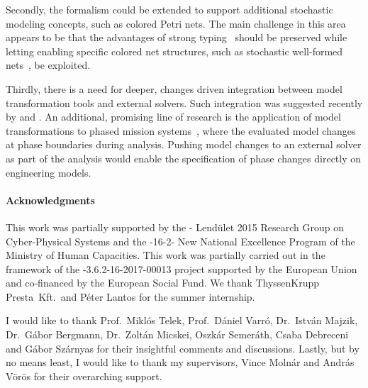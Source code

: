 Secondly, the  formalism could be extended to support additional stochastic modeling concepts, such as colored Petri nets. The main challenge in this area appears to be that the advantages of strong typing~\citep{Kindler07modular} should be preserved while letting enabling specific colored net structures, such as stochastic well-formed nets~\citep{Chiola93swn}, be exploited.

Thirdly, there is a need for deeper, changes driven integration between model transformation tools and external solvers. Such integration was suggested recently by \citet{Molnar16componentwise} and \citet[Section~2.8]{Meyers16thesis}. An additional, promising line of research is the application of model transformations to phased mission systems~\citep{Mura01pms}, where the evaluated model changes at phase boundaries during analysis. Pushing model changes to an external solver as part of the analysis would enable the specification of phase changes directly on engineering models.

\paragraph*{Acknowledgments}
{}

This work was partially supported by the - Lendület 2015 Research Group on Cyber-Physical Systems and the -16-2- New National Excellence Program of the Ministry of Human Capacities. This work was partially carried out in the framework of the -3.6.2-16-2017-00013 project supported by the European Union and co-financed by the European Social Fund. We thank ThyssenKrupp Presta~Kft.\ and Péter Lantos for the summer internship.

I would like to thank Prof.~Miklós Telek, Prof.~Dániel Varró, Dr.~István Majzik, Dr.~Gábor Bergmann, Dr.~Zoltán Micskei, Oszkár Semeráth, Csaba Debreceni and Gábor Szárnyas for their insightful comments and discussions. Lastly, but by no means least, I would like to thank my supervisors, Vince Molnár and András Vörös for their overarching support.